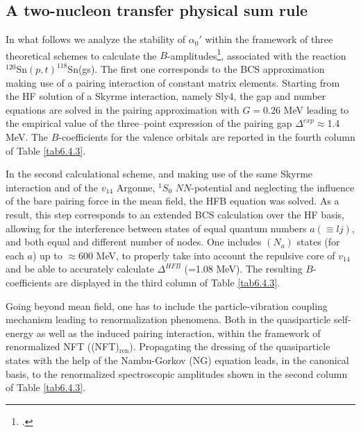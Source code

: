 \subsection{A two-nucleon transfer physical sum rule}\label{S6.4.2}
 In what follows we analyze the stability of $\alpha_0'$ within the framework of three theoretical schemes to calculate the $B$-amplitudes\footnote{\cite{Potel:17}.}, associated with the reaction $^{120}$Sn$(p,t)^{118}$Sn(gs). The first one corresponds to the BCS approximation making use of a pairing interaction of constant matrix elements.  Starting from the HF solution of a Skyrme interaction, namely Sly4, the gap and number equations are solved in the pairing approximation with $G=0.26$ MeV leading to the empirical value of the three--point expression of the pairing gap $\Delta^{exp}\approx$1.4 MeV. The $B$-coefficients for the valence orbitals are reported in the fourth column of Table \ref{tab6.4.3}. 




In the second calculational scheme, and making use of the same Skyrme interaction and of the $v_{14}$ Argonne, $^1S_0$ $NN$-potential and neglecting the influence of the bare
pairing force in the mean field,
the HFB equation was solved. As a result, this step corresponds to an extended BCS calculation over the HF basis, allowing for the 
interference between states of equal quantum numbers $a (\equiv lj)$, and both equal and different number of nodes. One includes $(N_a)$ states
(for each $a$) up to $\approx $600 MeV, to properly take into account  the repulsive core of $v_{14}$ and be able to accurately calculate 
$\Delta^{HFB}$ (=1.08 MeV). The resulting $B$-coefficients are displayed in the third column of Table \ref{tab6.4.3}.


 Going beyond mean field,  one has to include the particle-vibration coupling mechanism leading to renormalization phenomena.  Both in the quasiparticle self-energy as well as  the  induced pairing interaction, within the framework of renormalized NFT ((NFT)$_{\text{ren}}$). Propagating the  dressing of the quasiparticle states with the help of the  Nambu-Gorkov (NG) equation leads, in the canonical basis, to the renormalized spectroscopic amplitudes shown in the second column of Table \ref{tab6.4.3}. 


